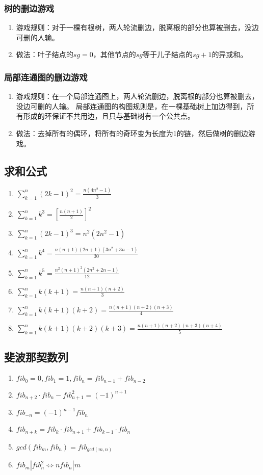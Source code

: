 	\subsubsection{树的删边游戏}
		\begin{enumerate}
			\item
				游戏规则：对于一棵有根树，两人轮流删边，脱离根的部分也算被删去，没边可删的人输。
			\item
				做法：叶子结点的$sg=0$，其他节点的$sg$等于儿子结点的$sg+1$的异或和。
		\end{enumerate}
	\subsubsection{局部连通图的删边游戏}
		\begin{enumerate}
			\item
				游戏规则：在一个局部连通图上，两人轮流删边，脱离根的部分也算被删去，没边可删的人输。
				局部连通图的构图规则是，在一棵基础树上加边得到，所有形成的环保证不共用边，且只与基础树有一个公共点。
			\item
				做法：去掉所有的偶环，将所有的奇环变为长度为1的链，然后做树的删边游戏。
		\end{enumerate}
\subsection{求和公式}
	\begin{enumerate}
		\item $\sum_{k=1}^{n}(2k-1)^2 = \frac{n(4n^2-1)}{3}	$
		\item $\sum_{k=1}^{n}k^3 = [\frac{n(n+1)}{2}]^2	$
		\item $\sum_{k=1}^{n}(2k-1)^3 = n^2(2n^2-1)	$
		\item $\sum_{k=1}^{n}k^4 = \frac{n(n+1)(2n+1)(3n^2+3n-1)}{30}  $
		\item $\sum_{k=1}^{n}k^5 = \frac{n^2(n+1)^2(2n^2+2n-1)}{12}	$
		\item $\sum_{k=1}^{n}k(k+1) = \frac{n(n+1)(n+2)}{3}	$
		\item $\sum_{k=1}^{n}k(k+1)(k+2) = \frac{n(n+1)(n+2)(n+3)}{4} $
		\item $\sum_{k=1}^{n}k(k+1)(k+2)(k+3) = \frac{n(n+1)(n+2)(n+3)(n+4)}{5} $
	\end{enumerate}
\subsection{斐波那契数列}
	\begin{enumerate}
		\item $fib_0=0, fib_1=1, fib_n=fib_{n-1}+fib_{n-2}$
		\item $fib_{n+2} \cdot fib_n-fib_{n+1}^2=(-1)^{n+1}$
		\item $fib_{-n}=(-1)^{n-1}fib_n$
		\item $fib_{n+k}=fib_k \cdot fib_{n+1}+fib_{k-1} \cdot fib_n$
		\item $gcd(fib_m, fib_n)=fib_{gcd(m, n)}$
		\item $fib_m|fib_n^2\Leftrightarrow nfib_n|m$
	\end{enumerate}
